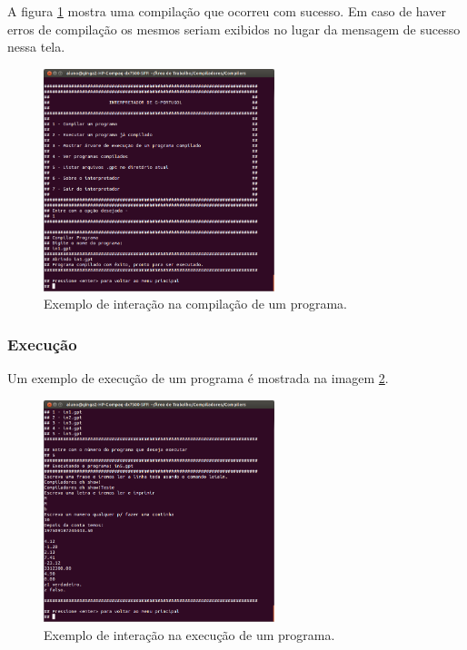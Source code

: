 \documentclass[a4paper,12pt]{report}
\begin{document}
A figura \ref{fig:compilacao} mostra uma compila\c{c}\~ao que ocorreu com sucesso. Em caso de haver erros de compila\c{c}\~ao os mesmos seriam exibidos no lugar da mensagem de sucesso nessa tela.

\begin{figure}
\centering
\includegraphics[width=0.6\textwidth]{imgs/Compilado.png}
\caption{\label{fig:compilacao}Exemplo de intera\c{c}\~ao na compila\c{c}\~ao de um programa.}
\end{figure}

\subsubsection{Execu\c{c}\~ao}

Um exemplo de execu\c{c}\~ao de um programa \'e mostrada na imagem \ref{fig:exec}.

\begin{figure}
\centering
\includegraphics[width=0.6\textwidth]{imgs/Execucao_de_um_programa.png}
\caption{\label{fig:exec}Exemplo de intera\c{c}\~ao na execu\c{c}\~ao de um programa.}
\end{figure}
\end{document}
